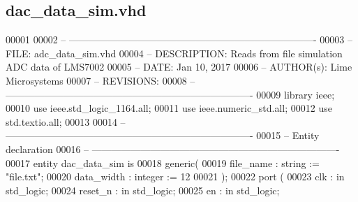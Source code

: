 \subsection{dac\+\_\+data\+\_\+sim.\+vhd}
\label{dac__data__sim_8vhd_source}

\begin{DoxyCode}
00001 
00002 \textcolor{keyword}{-- ---------------------------------------------------------------------------- }
00003 \textcolor{keyword}{-- FILE:    adc\_data\_sim.vhd}
00004 \textcolor{keyword}{-- DESCRIPTION: Reads from file simulation ADC data of LMS7002}
00005 \textcolor{keyword}{-- DATE:    Jan 10, 2017}
00006 \textcolor{keyword}{-- AUTHOR(s):   Lime Microsystems}
00007 \textcolor{keyword}{-- REVISIONS:}
00008 \textcolor{keyword}{-- ---------------------------------------------------------------------------- }
00009 \textcolor{vhdlkeyword}{library }\textcolor{keywordflow}{ieee};
00010 \textcolor{vhdlkeyword}{use }ieee.std\_logic\_1164.\textcolor{keywordflow}{all};
00011 \textcolor{vhdlkeyword}{use }ieee.numeric\_std.\textcolor{keywordflow}{all};
00012 \textcolor{vhdlkeyword}{use }std.textio.\textcolor{keywordflow}{all};
00013 
00014 \textcolor{keyword}{-- ----------------------------------------------------------------------------}
00015 \textcolor{keyword}{-- Entity declaration}
00016 \textcolor{keyword}{-- ----------------------------------------------------------------------------}
00017 \textcolor{keywordflow}{entity }dac_data_sim \textcolor{keywordflow}{is}
00018    \textcolor{keywordflow}{generic}\textcolor{vhdlchar}{(} 
00019         file\_name   : \textcolor{comment}{string}    := "file.txt";
00020       \textcolor{vhdlchar}{data_width}    \textcolor{vhdlchar}{:} \textcolor{comment}{integer}   \textcolor{vhdlchar}{:=} \textcolor{vhdllogic}{}\textcolor{vhdllogic}{12}       
00021     \textcolor{vhdlchar}{)};
00022     \textcolor{keywordflow}{port} \textcolor{vhdlchar}{(}
00023       \textcolor{vhdlchar}{clk}           \textcolor{vhdlchar}{:} \textcolor{keywordflow}{in} \textcolor{comment}{std\_logic};
00024       \textcolor{vhdlchar}{reset_n}       \textcolor{vhdlchar}{:} \textcolor{keywordflow}{in} \textcolor{comment}{std\_logic};
00025         \textcolor{vhdlchar}{en}              \textcolor{vhdlchar}{:} \textcolor{keywordflow}{in} \textcolor{comment}{std\_logic};

\end{DoxyCode}
